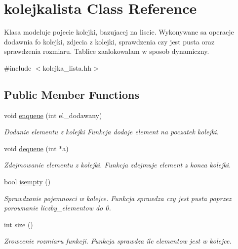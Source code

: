 \hypertarget{classkolejkalista}{\section{kolejkalista Class Reference}
\label{classkolejkalista}
}


Klasa modeluje pojecie kolejki, bazujacej na liscie. Wykonywane sa operacje dodawnia fo kolejki, zdjecia z kolejki, sprawdzenia czy jest pusta oraz sprawdzenia rozmiaru. Tablice zaalokowalam w sposob dynamiczny.  




{\ttfamily \#include $<$kolejka\-\_\-lista.\-hh$>$}

\subsection*{Public Member Functions}
\begin{DoxyCompactItemize}
\item 
void \hyperlink{classkolejkalista_a32d0ea8aed298035a84f2bd1fedea0ef}{enqueue} (int el\-\_\-dodawany)
\begin{DoxyCompactList}\small\item\em Dodanie elementu z kolejki Funkcja dodaje element na poczatek kolejki. \end{DoxyCompactList}\item 
void \hyperlink{classkolejkalista_a31d4f038aafc4472ab2eebf20021820a}{dequeue} (int $\ast$a)
\begin{DoxyCompactList}\small\item\em Zdejmowanie elementu z kolejki. Funkcja zdejmuje element z konca kolejki. \end{DoxyCompactList}\item 
bool \hyperlink{classkolejkalista_ac3e0509cda7ba208478ecf3c5bbabd14}{isempty} ()
\begin{DoxyCompactList}\small\item\em Sprawdzanie pojemnosci w kolejce. Funkcja sprawdza czy jest pusta poprzez porownanie liczby\-\_\-elementow do 0. \end{DoxyCompactList}\item 
int \hyperlink{classkolejkalista_a2f53de089b8a97474de6b42b1da04928}{size} ()
\begin{DoxyCompactList}\small\item\em Zrowcenie rozmiaru funkcji. Funkcja sprawdza ile elementow jest w kolejce. \end{DoxyCompactList}\end{DoxyCompactItemize}


